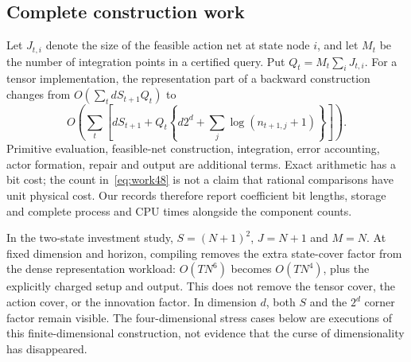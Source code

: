 \subsection{Complete construction work}
Let $J_{t,i}$ denote the size of the feasible action net at state node $i$, and let $M_t$ be the number of integration points in a certified query. Put $Q_t=M_t\sum_iJ_{t,i}$. For a tensor implementation, the representation part of a backward construction changes from $O(\sum_t dS_{t+1}Q_t)$ to
\begin{equation}\label{eq:work48}
 O\!\left(\sum_t\left[dS_{t+1}
 +Q_t\left\{d2^d+\sum_j\log(n_{t+1,j}+1)\right\}\right]\right).
\end{equation}
Primitive evaluation, feasible-net construction, integration, error accounting, actor formation, repair and output are additional terms. Exact arithmetic has a bit cost; the count in~\eqref{eq:work48} is not a claim that rational comparisons have unit physical cost. Our records therefore report coefficient bit lengths, storage and complete process and CPU times alongside the component counts.

In the two-state investment study, $S=(N+1)^2$, $J=N+1$ and $M=N$. At fixed dimension and horizon, compiling removes the extra state-cover factor from the dense representation workload: $O(TN^6)$ becomes $O(TN^4)$, plus the explicitly charged setup and output. This does not remove the tensor cover, the action cover, or the innovation factor. In dimension $d$, both $S$ and the $2^d$ corner factor remain visible. The four-dimensional stress cases below are executions of this finite-dimensional construction, not evidence that the curse of dimensionality has disappeared.


